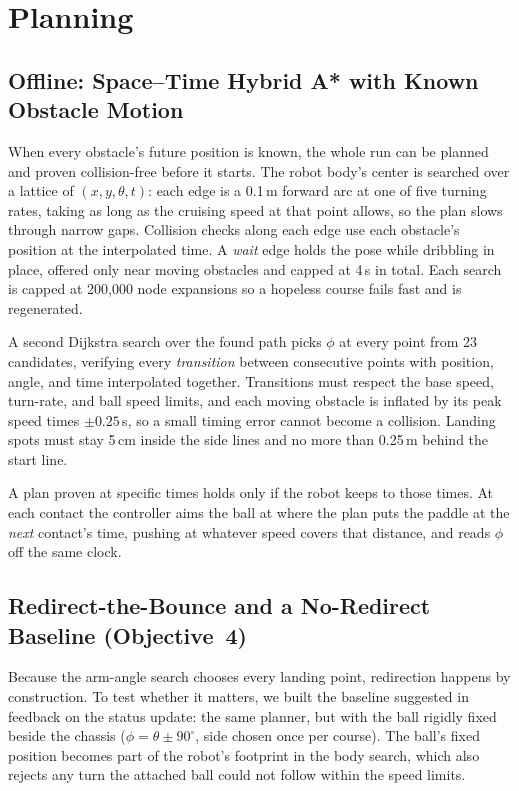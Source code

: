 \documentclass[10pt,twocolumn]{article}
\begin{document}
\section{Planning}

\subsection{Offline: Space--Time Hybrid A* with Known Obstacle Motion}
\label{sec:offline}
When every obstacle's future position is known, the whole run can be
planned and proven collision-free before it starts. The robot body's
center is searched over a lattice of $(x, y, \theta, t)$: each edge is a
0.1\,m forward arc at one of five turning rates, taking as long as the
cruising speed at that point allows, so the plan slows through narrow
gaps. Collision checks along each edge use each obstacle's position at
the interpolated time. A \emph{wait} edge holds the pose while dribbling
in place, offered only near moving obstacles and capped at 4\,s in total.
Each search is capped at 200{,}000 node expansions so a hopeless course
fails fast and is regenerated.

A second Dijkstra search over the found path picks $\phi$ at every point
from 23 candidates, verifying every \emph{transition} between consecutive
points with position, angle, and time interpolated together. Transitions
must respect the base speed, turn-rate, and ball speed limits, and each
moving obstacle is inflated by its peak speed times $\pm0.25$\,s, so a
small timing error cannot become a collision. Landing spots must stay
5\,cm inside the side lines and no more than 0.25\,m behind the start
line.

A plan proven at specific times holds only if the robot keeps to those
times. At each contact the controller aims the ball at where the plan
puts the paddle at the \emph{next} contact's time, pushing at whatever
speed covers that distance, and reads $\phi$ off the same clock.

\subsection{Redirect-the-Bounce and a No-Redirect Baseline (Objective~4)}
Because the arm-angle search chooses every landing point, redirection
happens by construction. To test whether it matters, we built the
baseline suggested in feedback on the status update: the same planner,
but with the ball rigidly fixed beside the chassis ($\phi = \theta \pm
90^\circ$, side chosen once per course). The ball's fixed position becomes
part of the robot's footprint in the body search, which also rejects any
turn the attached ball could not follow within the speed limits.
\end{document}
